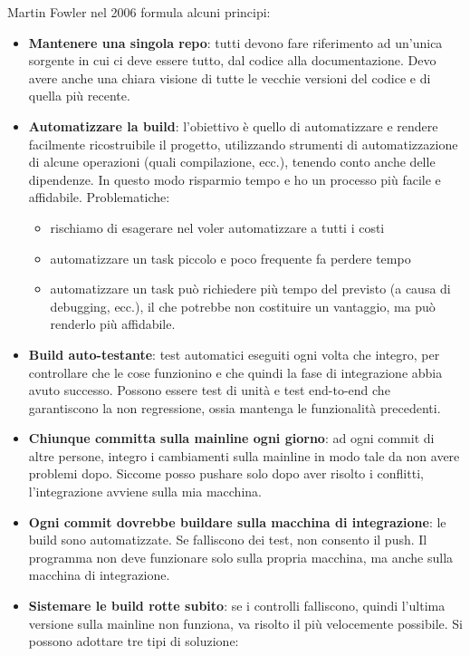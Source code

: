 Martin Fowler nel 2006 formula alcuni principi:
\begin{itemize}
\item \textbf{Mantenere una singola repo}:  tutti devono fare riferimento ad un’unica sorgente in cui ci deve essere tutto, dal codice alla documentazione. Devo avere anche una chiara visione di tutte le vecchie versioni del codice e di quella più recente.
\item \textbf{Automatizzare la build}: l'obiettivo è quello di automatizzare e rendere facilmente ricostruibile il progetto, utilizzando strumenti di automatizzazione di alcune operazioni (quali compilazione, ecc.), tenendo conto anche delle dipendenze. In questo modo risparmio tempo e ho un processo più facile e affidabile. Problematiche:
\begin{itemize}
    \item rischiamo di esagerare nel voler automatizzare a tutti i costi 
    \item automatizzare un task piccolo e poco frequente fa perdere tempo
    \item automatizzare un task può richiedere più tempo del previsto (a causa di debugging, ecc.), il che potrebbe non costituire un vantaggio, ma può renderlo più affidabile.
\end{itemize}
\item \textbf{Build auto-testante}: test automatici eseguiti ogni volta che integro, per controllare che le cose funzionino e che quindi la fase di integrazione abbia avuto successo. Possono essere test di unità e test end-to-end che garantiscono la non regressione, ossia mantenga le funzionalità precedenti.
\item \textbf{Chiunque committa sulla mainline ogni giorno}: ad ogni commit di altre persone, integro i cambiamenti sulla mainline in modo tale da non avere problemi dopo. Siccome posso pushare solo dopo aver risolto i conflitti, l'integrazione avviene sulla mia macchina.
\item \textbf{Ogni commit dovrebbe buildare sulla macchina di integrazione}: le build sono automatizzate. Se falliscono dei test, non consento il push. Il programma non deve funzionare solo sulla propria macchina, ma anche sulla macchina di integrazione.
\item \textbf{Sistemare le build rotte subito}: se i controlli falliscono, quindi l'ultima versione sulla mainline non funziona, va risolto il più velocemente possibile. Si possono adottare tre tipi di soluzione: 
\begin{itemize}

\end{itemize}
\end{itemize}
